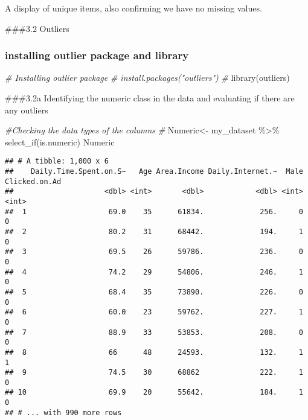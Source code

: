 \documentclass[
]{article}
\newenvironment{Shaded}{\begin{snugshade}}{\end{snugshade}}
\newcommand{\CommentTok}[1]{\textcolor[rgb]{0.56,0.35,0.01}{\textit{#1}}}
\newcommand{\FunctionTok}[1]{\textcolor[rgb]{0.00,0.00,0.00}{#1}}
\newcommand{\NormalTok}[1]{#1}
\newcommand{\OtherTok}[1]{\textcolor[rgb]{0.56,0.35,0.01}{#1}}
\newcommand{\SpecialCharTok}[1]{\textcolor[rgb]{0.00,0.00,0.00}{#1}}
\begin{document}
A display of unique items, also confirming we have no missing values.

\#\#\#3.2 Outliers

\hypertarget{installing-outlier-package-and-library}{%
\subsubsection{installing outlier package and
library}\label{installing-outlier-package-and-library}}

\begin{Shaded}
\begin{Highlighting}[]
\CommentTok{\# Installing outlier package}
\CommentTok{\# install.packages("outliers")}
\CommentTok{\#}
\FunctionTok{library}\NormalTok{(outliers)}
\end{Highlighting}
\end{Shaded}

\#\#\#3.2a Identifying the numeric class in the data and evaluating if
there are any outliers

\begin{Shaded}
\begin{Highlighting}[]
\CommentTok{\#Checking the data types of the columns}
\CommentTok{\#}
\NormalTok{Numeric}\OtherTok{\textless{}{-}}\NormalTok{ my\_dataset }\SpecialCharTok{\%\textgreater{}\%} \FunctionTok{select\_if}\NormalTok{(is.numeric)}
\NormalTok{Numeric}
\end{Highlighting}
\end{Shaded}

\begin{verbatim}
## # A tibble: 1,000 x 6
##    Daily.Time.Spent.on.S~   Age Area.Income Daily.Internet.~  Male Clicked.on.Ad
##                     <dbl> <int>       <dbl>            <dbl> <int>         <int>
##  1                   69.0    35      61834.             256.     0             0
##  2                   80.2    31      68442.             194.     1             0
##  3                   69.5    26      59786.             236.     0             0
##  4                   74.2    29      54806.             246.     1             0
##  5                   68.4    35      73890.             226.     0             0
##  6                   60.0    23      59762.             227.     1             0
##  7                   88.9    33      53853.             208.     0             0
##  8                   66      48      24593.             132.     1             1
##  9                   74.5    30      68862              222.     1             0
## 10                   69.9    20      55642.             184.     1             0
## # ... with 990 more rows
\end{verbatim}
\end{document}
